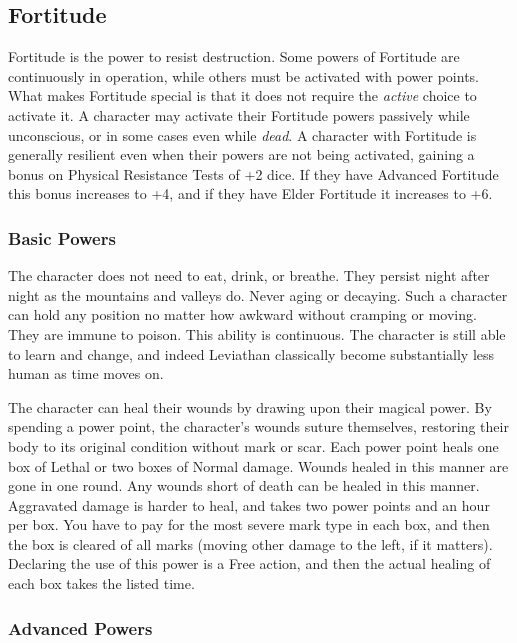 \subsection{Fortitude}

Fortitude is the power to resist destruction. Some powers of Fortitude are continuously in operation, while others must be activated with power points. What makes Fortitude special is that it does not require the \textit{active} choice to activate it. A character may activate their Fortitude powers passively while unconscious, or in some cases even while \textit{dead}. A character with Fortitude is generally resilient even when their powers are not being activated, gaining a bonus on Physical Resistance Tests of +2 dice. If they have Advanced Fortitude this bonus increases to +4, and if they have Elder Fortitude it increases to +6.

\subsubsection{Basic Powers}

 The character does not need to eat, drink, or breathe. They persist night after night as the mountains and valleys do. Never aging or decaying. Such a character can hold any position no matter how awkward without cramping or moving. They are immune to poison. This ability is continuous. The character is still able to learn and change, and indeed Leviathan classically become substantially less human as time moves on.

 The character can heal their wounds by drawing upon their magical power. By spending a power point, the character's wounds suture themselves, restoring their body to its original condition without mark or scar. Each power point heals one box of Lethal or two boxes of Normal damage. Wounds healed in this manner are gone in one round. Any wounds short of death can be healed in this manner. Aggravated damage is harder to heal, and takes two power points and an hour per box. You have to pay for the most severe mark type in each box, and then the box is cleared of all marks (moving other damage to the left, if it matters). Declaring the use of this power is a Free action, and then the actual healing of each box takes the listed time.


\subsubsection{Advanced Powers}

